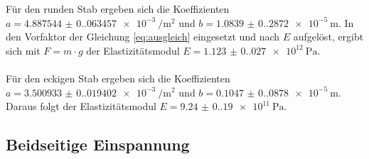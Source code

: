 Für den runden Stab ergeben sich  die Koeffizienten $a = \SI{4.887544(0.063457)e-3}{\per\meter\squared}$ und $b = \SI{1.0839(0.2872)e-5}{\meter}$.
In den Vorfaktor der Gleichung \eqref{eq:ausgleich} eingesetzt und nach $E$ aufgelöst,
ergibt sich mit $F = m \cdot g$ der Elastizitätsmodul $E = \SI{1.123(0.027)e12}{\pascal}.$\\
\\
Für den eckigen Stab ergeben sich die Koeffizienten $a = \SI{3.500933(0.019402)e-3}{\per\meter\squared}$ und $b = \SI{0.1047(0.0878)e-5}{\meter}$.
Daraus folgt der Elastizitätsmodul $E = \SI{9.24(0.19)e11}{\pascal}.$


\newpage
\subsection{Beidseitige Einspannung}

